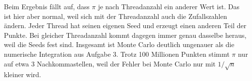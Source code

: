 \documentclass[11pt]{article}
\begin{document}
Beim Ergebnis fällt auf, dass $\pi$ je nach Threadanzahl ein anderer Wert ist. Das ist hier aber
normal, weil sich mit der Threadanzahl auch die Zufallszahlen ändern. Jeder Thread hat seinen
eigenen Seed und erzeugt einen anderen Teil der Punkte. Bei gleicher Threadanzahl kommt dagegen
immer genau dasselbe heraus, weil die Seeds fest sind. Insgesamt ist Monte Carlo deutlich
ungenauer als die numerische Integration aus Aufgabe 3. Trotz 100 Millionen Punkten stimmt $\pi$
nur auf etwa 3 Nachkommastellen, weil der Fehler bei Monte Carlo nur mit $1/\sqrt{n}$ kleiner wird.
\end{document}
